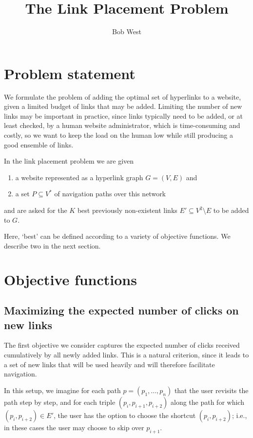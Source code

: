 \documentclass[11pt,letterpaper]{article}
\begin{document}
\title{The Link Placement Problem}
\author{Bob West}
\maketitle


\section{Problem statement}

We formulate the problem of adding the optimal set of hyperlinks to a website, given a limited budget of links that may be added.
Limiting the number of new links may be important in practice, since links typically need to be added, or at least checked, by a human website administrator, which is time-consuming and costly, so we want to keep the load on the human low while still producing a good ensemble of links.

In the link placement problem we are given
\begin{enumerate}
\item a website represented as a hyperlink graph $G=(V,E)$ and
\item a set $P \subseteq V^*$ of navigation paths over this network
\end{enumerate}
and are asked for the $K$ best previously non-existent links $E' \subseteq V^2 \setminus E$ to be added to $G$.

Here, `best' can be defined according to a variety of objective functions.
We describe two in the next section.


\section{Objective functions}

\subsection{Maximizing the expected number of clicks on new links}

The first objective we consider captures the expected number of clicks received cumulatively by all newly added links.
This is a natural criterion, since it leads to a set of new links that will be used heavily and will therefore facilitate navigation.

In this setup, we imagine for each path $p=(p_1,\dots,p_n)$ that the user revisits the path step by step, and for each triple $(p_i,p_{i+1},p_{i+2})$ along the path for which $(p_i,p_{i+2}) \in E'$, the user has the option to choose the shortcut $(p_i,p_{i+2})$; i.e., in these cases the user may choose to skip over $p_{i+1}$.
\end{document}
